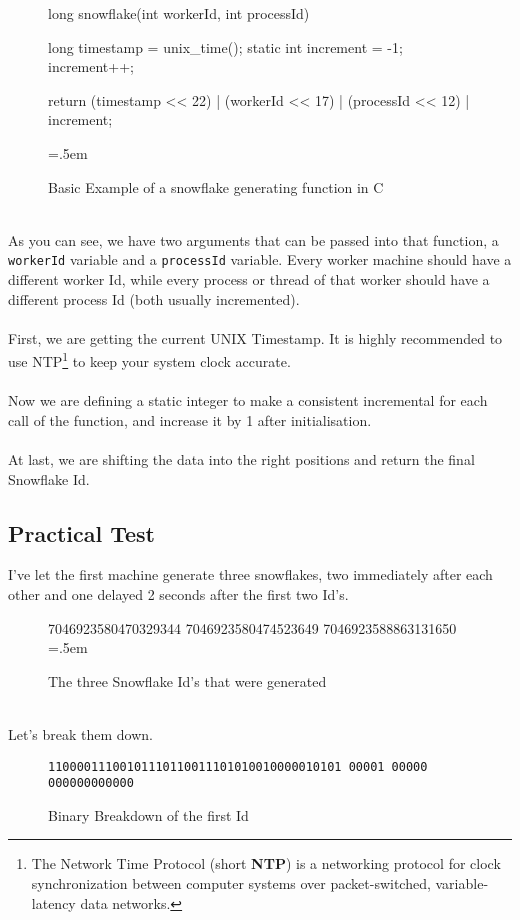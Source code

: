 \documentclass{article}
\newcommand{\code}[1]{\colorbox{cverbbg}{\texttt{#1}}}
\newcommand{\hn}[0]{\hfill \\}
\newenvironment{lcverbatim}
{\SaveVerbatim{cverb}}
{\endSaveVerbatim{}
	\flushleft\fboxrule=0pt\fboxsep=.5em
	\colorbox{cverbbg}{%

		\makebox[\dimexpr\linewidth-2\fboxsep][l]{\BUseVerbatim{cverb}}%
	}
	\endflushleft{}
}
\begin{document}
\begin{figure}[H]
	\begin{lcverbatim}
	long snowflake(int workerId, int processId) {
		long timestamp = unix_time();
		static int increment = -1;
		increment++;

		return (timestamp << 22)
			| (workerId << 17)
			| (processId << 12)
			| increment;
	}
	\end{lcverbatim}
	\caption{Basic Example of a snowflake generating function in
		C}\label{fig:ex_gen_function}
\end{figure}
\hn{}
As you can see, we have two arguments that can be passed into that function, a
\code{workerId} variable and a \code{processId} variable. Every worker machine
should have a different worker Id, while every process or thread of that worker
should have a different process Id (both usually incremented).\\
\hn{}
First, we are getting the current UNIX Timestamp. It is highly recommended to
use NTP\footnote{The Network Time Protocol (short \textbf{NTP}) is a networking
	protocol for clock synchronization between computer systems over
	packet-switched, variable-latency data networks.} to keep your system
clock
accurate. \\
\hn{}
Now we are defining a static integer to make a consistent incremental for each
call of the function, and increase it by 1 after initialisation. \\
\hn{}
At last, we are shifting the data into the right positions and return the final
Snowflake Id.\@

\pagebreak

\subsection{Practical Test}
I've let the first machine generate three snowflakes, two immediately after
each other and one delayed 2 seconds after the first two Id's.

\begin{figure}[H]
	\begin{lcverbatim}
	7046923580470329344
	7046923580474523649
	7046923588863131650
	\end{lcverbatim}
	\caption{The three Snowflake Id's that were
		generated}\label{fig:output_1}
\end{figure}
\hn{}
Let's break them down. \\

\begin{figure}[H]
	\large{\texttt{\color{cyan}11000011100101110110011101010010000010101
			\color{red}00001 \color{green}00000
			\color{gray}000000000000}}
	\\
	\caption{Binary Breakdown of the first Id}\label{fig:breakdown_1}
\end{figure}
\end{document}
